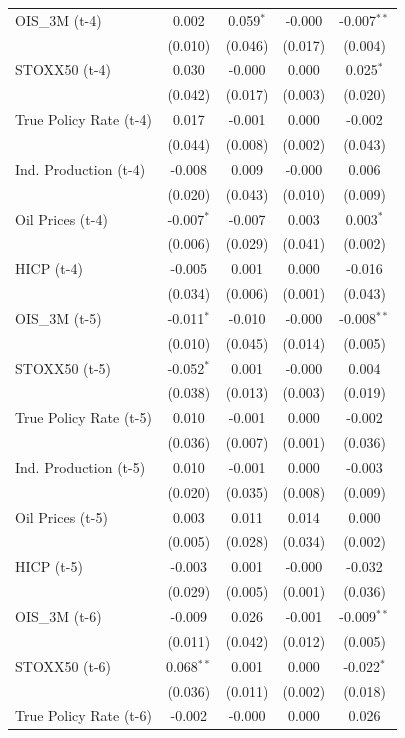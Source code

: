 \begin{longtable}[t]{lcccc}
OIS\_3M (t-4) & 0.002 & 0.059$^{*}$ & -0.000 & -0.007$^{**}$\\
 & (0.010) & (0.046) & (0.017) & (0.004)\\
STOXX50 (t-4) & 0.030 & -0.000 & 0.000 & 0.025$^{*}$\\
 & (0.042) & (0.017) & (0.003) & (0.020)\\
True Policy Rate (t-4) & 0.017 & -0.001 & 0.000 & -0.002\\
 & (0.044) & (0.008) & (0.002) & (0.043)\\
Ind. Production (t-4) & -0.008 & 0.009 & -0.000 & 0.006\\
 & (0.020) & (0.043) & (0.010) & (0.009)\\
Oil Prices (t-4) & -0.007$^{*}$ & -0.007 & 0.003 & 0.003$^{*}$\\
 & (0.006) & (0.029) & (0.041) & (0.002)\\
HICP (t-4) & -0.005 & 0.001 & 0.000 & -0.016\\
 & (0.034) & (0.006) & (0.001) & (0.043)\\
OIS\_3M (t-5) & -0.011$^{*}$ & -0.010 & -0.000 & -0.008$^{**}$\\
 & (0.010) & (0.045) & (0.014) & (0.005)\\
STOXX50 (t-5) & -0.052$^{*}$ & 0.001 & -0.000 & 0.004\\
 & (0.038) & (0.013) & (0.003) & (0.019)\\
True Policy Rate (t-5) & 0.010 & -0.001 & 0.000 & -0.002\\
 & (0.036) & (0.007) & (0.001) & (0.036)\\
Ind. Production (t-5) & 0.010 & -0.001 & 0.000 & -0.003\\
 & (0.020) & (0.035) & (0.008) & (0.009)\\
Oil Prices (t-5) & 0.003 & 0.011 & 0.014 & 0.000\\
 & (0.005) & (0.028) & (0.034) & (0.002)\\
HICP (t-5) & -0.003 & 0.001 & -0.000 & -0.032\\
 & (0.029) & (0.005) & (0.001) & (0.036)\\
OIS\_3M (t-6) & -0.009 & 0.026 & -0.001 & -0.009$^{**}$\\
 & (0.011) & (0.042) & (0.012) & (0.005)\\
STOXX50 (t-6) & 0.068$^{**}$ & 0.001 & 0.000 & -0.022$^{*}$\\
 & (0.036) & (0.011) & (0.002) & (0.018)\\
True Policy Rate (t-6) & -0.002 & -0.000 & 0.000 & 0.026\\

\end{longtable}
